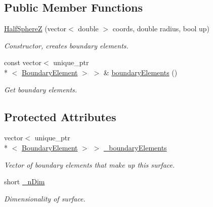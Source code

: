 \subsection*{Public Member Functions}
\begin{DoxyCompactItemize}
\item 
\hyperlink{classHalfSphereZ_ac08b9f1f91d76fd62df48fec94fd17fd}{Half\+Sphere\+Z} (vector$<$ double $>$ coords, double radius, bool up)
\begin{DoxyCompactList}\small\item\em Constructor, creates boundary elements. \end{DoxyCompactList}\item 
const vector$<$ unique\+\_\+ptr\\*
$<$ \hyperlink{classBoundaryElement}{Boundary\+Element} $>$ $>$ \& \hyperlink{classBoundarySurface_a402dcf23f4f96110569d01e401edee5a}{boundary\+Elements} ()
\begin{DoxyCompactList}\small\item\em Get boundary elements. \end{DoxyCompactList}\end{DoxyCompactItemize}
\subsection*{Protected Attributes}
\begin{DoxyCompactItemize}
\item 
vector$<$ unique\+\_\+ptr\\*
$<$ \hyperlink{classBoundaryElement}{Boundary\+Element} $>$ $>$ \hyperlink{classBoundarySurface_a67f60b2d22fb67f097e98025803d3d34}{\+\_\+boundary\+Elements}
\begin{DoxyCompactList}\small\item\em Vector of boundary elements that make up this surface. \end{DoxyCompactList}\item 
short \hyperlink{classBoundarySurface_af3ed79310c6ba6cdc8e9f176bf463eb1}{\+\_\+n\+Dim}
\begin{DoxyCompactList}\small\item\em Dimensionality of surface. \end{DoxyCompactList}\end{DoxyCompactItemize}
